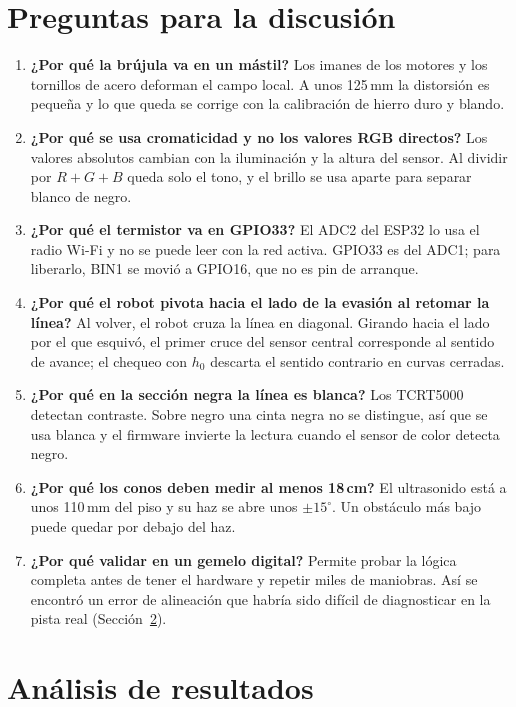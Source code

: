 \documentclass[10pt,a4paper,twocolumn]{article}
\begin{document}
\section{Preguntas para la discusión}
\begin{enumerate}[label=\textbf{\arabic*)},leftmargin=1.6em]
\item \textbf{¿Por qué la brújula va en un mástil?} Los imanes de los motores y los tornillos de acero deforman el campo local. A unos 125\,mm la distorsión es pequeña y lo que queda se corrige con la calibración de hierro duro y blando.
\item \textbf{¿Por qué se usa cromaticidad y no los valores RGB directos?} Los valores absolutos cambian con la iluminación y la altura del sensor. Al dividir por $R+G+B$ queda solo el tono, y el brillo se usa aparte para separar blanco de negro.
\item \textbf{¿Por qué el termistor va en GPIO33?} El ADC2 del ESP32 lo usa el radio Wi-Fi y no se puede leer con la red activa. GPIO33 es del ADC1; para liberarlo, BIN1 se movió a GPIO16, que no es pin de arranque.
\item \textbf{¿Por qué el robot pivota hacia el lado de la evasión al retomar la línea?} Al volver, el robot cruza la línea en diagonal. Girando hacia el lado por el que esquivó, el primer cruce del sensor central corresponde al sentido de avance; el chequeo con $h_0$ descarta el sentido contrario en curvas cerradas.
\item \textbf{¿Por qué en la sección negra la línea es blanca?} Los TCRT5000 detectan contraste. Sobre negro una cinta negra no se distingue, así que se usa blanca y el firmware invierte la lectura cuando el sensor de color detecta negro.
\item \textbf{¿Por qué los conos deben medir al menos 18\,cm?} El ultrasonido está a unos 110\,mm del piso y su haz se abre unos $\pm15^\circ$. Un obstáculo más bajo puede quedar por debajo del haz.
\item \textbf{¿Por qué validar en un gemelo digital?} Permite probar la lógica completa antes de tener el hardware y repetir miles de maniobras. Así se encontró un error de alineación que habría sido difícil de diagnosticar en la pista real (Sección~\ref{sec:resultados}).
\end{enumerate}

\section{Análisis de resultados}\label{sec:resultados}
\end{document}
